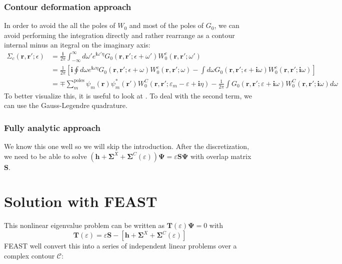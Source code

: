 \subsubsection{Contour deformation approach}
In order to avoid the all the poles of $W_0$ and most of the poles of $G_0$, we can avoid performing the integration directly and rather rearrange as a contour internal minus an itegral on the imaginary axis:
\begin{align}
    \Sigma_c(\mathbf{r}, \mathbf{r}'; \epsilon) &= \frac{\bm{i}}{2\pi} \int_{-\infty}^{\infty} d\omega' e^{\bm{i}\omega' \eta} G_0(\mathbf{r}, \mathbf{r}'; \epsilon + \omega') W_0^c(\mathbf{r}, \mathbf{r}'; \omega')\\
&= \frac{1}{2\pi} \left[ \bm{i} \oint d\omega e^{\bm{i}\omega \eta} G_0(\mathbf{r}, \mathbf{r}'; \epsilon + \omega) W_0^c(\mathbf{r}, \mathbf{r}'; \omega) -  \int d\omega G_0(\mathbf{r}, \mathbf{r}'; \epsilon + \bm{i}\omega) W_0^c(\mathbf{r}, \mathbf{r}'; \bm{i}\omega)\right]
\label{eq:contour_deformation}\\
&= \mp \sum_m^{\text{poles}} \psi_m(\mathbf{r}) \psi_m^*(\mathbf{r'}) W_0^C(\mathbf{r}, \mathbf{r'}; \varepsilon_m - \varepsilon + \bm{i}\eta) - \frac{1}{2\pi} \int G_0(\mathbf{r}, \mathbf{r'}; \varepsilon + \bm{i}\omega) W_0^C(\mathbf{r}, \mathbf{r'}; \bm{i}\omega) d\omega
\end{align}
   To better visualize this, it is useful to look at \cite{golze_gw_2019}. To deal with the second term, we can use the Gauss-Legendre quadrature.
\subsubsection{Fully analytic approach}
We know this one well so we will skip the introduction.
 After the discretization, we need to be able to solve
$\left(\mathbf{h}+\mathbf{\Sigma}^X+\mathbf{\Sigma}^C(\varepsilon)\right) \mathbf{\Psi}=\varepsilon \mathbf{S} \boldsymbol{\Psi}$ with overlap matrix $\mathbf{S}$.
\section{Solution with FEAST}
This nonlinear eigenvalue problem can be written as $\bm{T}(\varepsilon) \mathbf{\Psi} = 0$ with
\begin{equation}
    \bm{T}(\varepsilon) = \varepsilon \mathbf{S} - \left[\mathbf{h} + \mathbf{\Sigma}^X + \mathbf{\Sigma}^C(\varepsilon)\right]
\end{equation}
FEAST well convert this into a series of independent linear problems over a complex contour $\mathcal{C}$:
